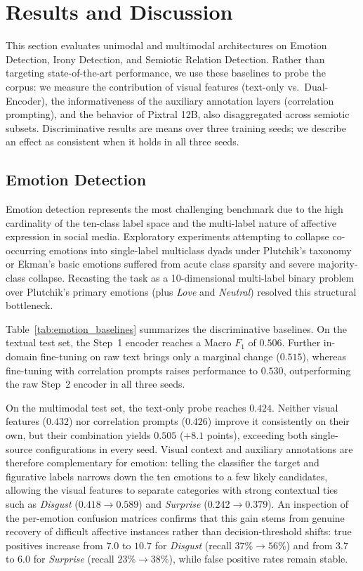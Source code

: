 \section{Results and Discussion}
\label{sec:results}

This section evaluates unimodal and multimodal architectures on Emotion Detection, Irony Detection, and Semiotic Relation Detection. Rather than targeting state-of-the-art performance, we use these baselines to probe the corpus: we measure the contribution of visual features (text-only vs.\ Dual-Encoder), the informativeness of the auxiliary annotation layers (correlation prompting), and the behavior of Pixtral 12B, also disaggregated across semiotic subsets. Discriminative results are means over three training seeds; we describe an effect as consistent when it holds in all three seeds.

\subsection{Emotion Detection}
\label{sec:emotion_results}

Emotion detection represents the most challenging benchmark due to the high cardinality of the ten-class label space and the multi-label nature of affective expression in social media. Exploratory experiments attempting to collapse co-occurring emotions into single-label multiclass dyads under Plutchik's taxonomy or Ekman's basic emotions \cite{ekman1992argument} suffered from acute class sparsity and severe majority-class collapse. Recasting the task as a 10-dimensional multi-label binary problem over Plutchik's primary emotions (plus \textit{Love} and \textit{Neutral}) resolved this structural bottleneck.

Table~\ref{tab:emotion_baselines} summarizes the discriminative baselines. On the textual test set, the Step~1 encoder reaches a Macro $F_1$ of $0.506$. Further in-domain fine-tuning on raw text brings only a marginal change ($0.515$), whereas fine-tuning with correlation prompts raises performance to $0.530$, outperforming the raw Step~2 encoder in all three seeds.

On the multimodal test set, the text-only probe reaches $0.424$. Neither visual features ($0.432$) nor correlation prompts ($0.426$) improve it consistently on their own, but their combination yields $0.505$ ($+8.1$ points), exceeding both single-source configurations in every seed. Visual context and auxiliary annotations are therefore complementary for emotion: telling the classifier the target and figurative labels narrows down the ten emotions to a few likely candidates, allowing the visual features to separate categories with strong contextual ties such as \textit{Disgust} ($0.418 \rightarrow 0.589$) and \textit{Surprise} ($0.242 \rightarrow 0.379$). An inspection of the per-emotion confusion matrices confirms that this gain stems from genuine recovery of difficult affective instances rather than decision-threshold shifts: true positives increase from $7.0$ to $10.7$ for \textit{Disgust} (recall $37\% \rightarrow 56\%$) and from $3.7$ to $6.0$ for \textit{Surprise} (recall $23\% \rightarrow 38\%$), while false positive rates remain stable.

